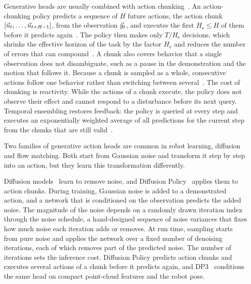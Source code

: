 Generative heads are usually combined with action chunking~\cite{Zhao2023,Chi2024}. An action-chunking policy predicts a sequence of $H$ future actions, the action chunk $[\vec{u}_t,\dots,\vec{u}_{t+H-1}]$, from the observation $\vec{y}_t$, and executes the first $H_{\mathrm{e}}\leq H$ of them before it predicts again~\cite{Zhao2023}.\label{sec:chunking-background} The policy then makes only $T/H_{\mathrm{e}}$ decisions, which shrinks the effective horizon of the task by the factor $H_{\mathrm{e}}$ and reduces the number of errors that can compound~\cite{Zhao2023}. A chunk also covers behavior that a single observation does not disambiguate, such as a pause in the demonstration and the motion that follows it. Because a chunk is sampled as a whole, consecutive actions follow one behavior rather than switching between several~\cite{Zhao2023,Chi2024}. The cost of chunking is reactivity. While the actions of a chunk execute, the policy does not observe their effect and cannot respond to a disturbance before its next query. Temporal ensembling restores feedback: the policy is queried at every step and executes an exponentially weighted average of all predictions for the current step from the chunks that are still valid~\cite{Zhao2023}.

Two families of generative action heads are common in robot learning, diffusion and flow matching. Both start from Gaussian noise and transform it step by step into an action, but they learn this transformation differently.

Diffusion models~\cite{Ho2020} learn to remove noise, and Diffusion Policy~\cite{Chi2024} applies them to action chunks. During training, Gaussian noise is added to a demonstrated action, and a network that is conditioned on the observation predicts the added noise. The magnitude of the noise depends on a randomly drawn iteration index through the noise schedule, a hand-designed sequence of noise variances that fixes how much noise each iteration adds or removes. At run time, sampling starts from pure noise and applies the network over a fixed number of denoising iterations, each of which removes part of the predicted noise. The number of iterations sets the inference cost. Diffusion Policy predicts action chunks and executes several actions of a chunk before it predicts again, and \ac{DP3}~\cite{Ze2024} conditions the same head on compact point-cloud features and the robot pose.


